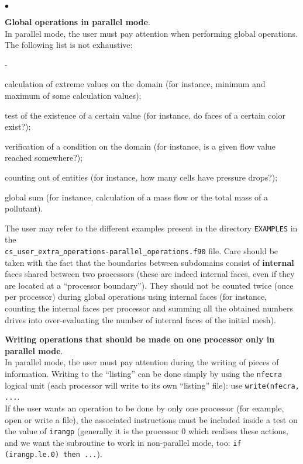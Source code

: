 {{{{\begin{list}{$\bullet$}{}
\item {\bf Global operations in parallel mode}.\\
In parallel mode, the user must pay attention when performing
      global operations. The following list is not exhaustive:
        \begin{list}{-}{}
\item calculation of extreme values on the domain (for instance, minimum
      and maximum of some calculation values);
\item test of the existence of a certain value (for instance, do faces
      of a certain color exist?);
\item verification of a condition on the domain (for instance, is a
      given flow value reached somewhere?);
\item counting out of entities (for instance, how many cells have
      pressure drops?);
\item global sum (for instance, calculation of a mass flow or the total
      mass of a pollutant).
      \end{list}
The user may refer to the different examples present in the directory \texttt{EXAMPLES} in the\\
\texttt{cs\_user\_extra\_operations-parallel\_operations.f90} file.
Care should be taken with the fact that the boundaries between
      subdomains consist of {\bf internal} faces shared between
      two processors (these are indeed internal faces, even if they are
      located at a ``processor boundary''). They should not be counted twice
      (once per processor) during global operations using internal faces
      (for instance, counting the internal faces per processor and
      summing all the obtained numbers drives into over-evaluating the
      number of internal faces of the initial mesh).

\item {\bf Writing operations that should be made on one
      processor only in parallel mode}.\\
In parallel mode, the user must pay attention during the writing of
      pieces of information. Writing to the ``listing'' can be done
      simply by using the \texttt{nfecra} logical unit (each processor will write
      to its own ``listing'' file): use
      \texttt{write(nfecra, ...}. \\
If the user wants an operation to be done by only one processor (for
      example, open or write a file), the associated instructions must
      be included inside a test on the value of \texttt{irangp} (generally it is
      the processor 0 which realises these actions, and we want the
      subroutine to work in non-parallel mode, too: \texttt{if
      (irangp.le.0) then ...}).
\end{list}

}}}}

